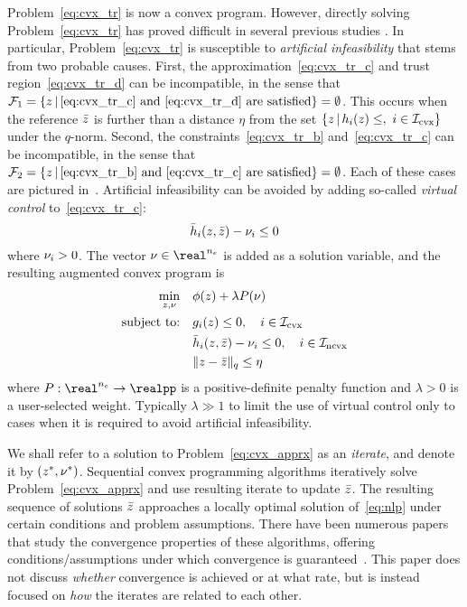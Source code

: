 \documentclass[letterpaper, 10 pt, conference]{ieeeconf}
\begin{document}
Problem~\eqref{eq:cvx_tr} is now a convex program. However, directly solving Problem~\eqref{eq:cvx_tr} has proved difficult in several previous studies . In particular, Problem~\eqref{eq:cvx_tr} is susceptible to \textit{artificial infeasibility} that stems from two probable causes. First, the approximation~\eqref{eq:cvx_tr_c} and trust region~\eqref{eq:cvx_tr_d} can be incompatible, in the sense that $\mathcal{F}_1 = \{z\,|\,\eqref{eq:cvx_tr_c}\text{ and }\eqref{eq:cvx_tr_d}\text{ are satisfied}\} = \emptyset$. This occurs when the reference $\bar{z}$ is further than a distance $\eta$ from the set $\{z\,|\,h_i(z)\leq,~i\in\mathcal{I}_{\text{cvx}}\}$ under the $q$-norm. Second, the constraints~\eqref{eq:cvx_tr_b} and~\eqref{eq:cvx_tr_c} can be incompatible, in the sense that $\mathcal{F}_2 = \{z\,|\,\eqref{eq:cvx_tr_b}\text{ and }\eqref{eq:cvx_tr_c}\text{ are satisfied}\}=\emptyset$. Each of these cases are pictured in~. Artificial infeasibility can be avoided by adding so-called \textit{virtual control} to~\eqref{eq:cvx_tr_c}:
\begin{equation}
\bar{h}_i(z,\bar{z}) - \nu_i \leq 0
\end{equation}
where $\nu_i > 0$. The vector $\vc\in\real^{n_e}$ is added as a solution variable, and the resulting augmented convex program is
\begin{subequations}\label{eq:cvx_apprx}
\begin{align}
\min_{z,\nu} &\quad \phi(z) + \lambda P(\nu) \label{eq:cvx_apprx_a} \\
\text{subject to:} &\quad g_i(z) \leq 0, \quad i\in\mathcal{I}_{\text{cvx}} \label{eq:cvx_apprx_b} \\
&\quad \bar{h}_i(z,\bar{z}) - \nu_i \leq 0, \quad i\in\mathcal{I}_{\text{ncvx}} \label{eq:cvx_apprx_c}\\
&\quad \|z-\bar{z}\|_q \leq \eta \label{eq:cvx_apprx_d}
\end{align}
\end{subequations}
where $P : \real^{n_e} \rightarrow \realpp$ is a positive-definite penalty function and $\lambda>0$ is a user-selected weight. Typically $\lambda \gg 1$ to limit the use of virtual control only to cases when it is required to avoid artificial infeasibility.

We shall refer to a solution to Problem~\eqref{eq:cvx_apprx} as an \textit{iterate}, and denote it by $(z^*,\nu^*)$. Sequential convex programming algorithms iteratively solve Problem~\eqref{eq:cvx_apprx} and use resulting iterate to update $\bar{z}$. The resulting sequence of solutions $\bar{z}$ approaches a locally optimal solution of~\eqref{eq:nlp} under certain conditions and problem assumptions. There have been numerous papers that study the convergence properties of these algorithms, offering conditions/assumptions under which convergence is guaranteed~. This paper does not discuss \textit{whether} convergence is achieved or at what rate, but is instead focused on \textit{how} the iterates are related to each other.
\end{document}
